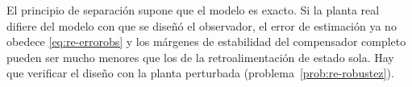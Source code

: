 \begin{cuidado}
El principio de separación supone que el modelo es exacto. Si la planta real difiere del modelo con que se diseñó el observador, el error de estimación ya no obedece \eqref{eq:re-errorobs} y los márgenes de estabilidad del compensador completo pueden ser mucho menores que los de la retroalimentación de estado sola. Hay que verificar el diseño con la planta perturbada (problema~\ref{prob:re-robustez}).
\end{cuidado}

